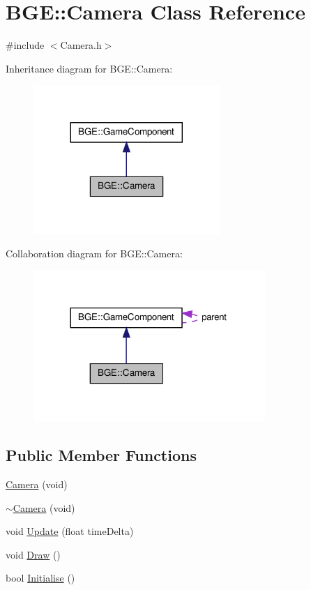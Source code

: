\hypertarget{class_b_g_e_1_1_camera}{\section{B\-G\-E\-:\-:Camera Class Reference}
\label{class_b_g_e_1_1_camera}
}


{\ttfamily \#include $<$Camera.\-h$>$}



Inheritance diagram for B\-G\-E\-:\-:Camera\-:
\nopagebreak
\begin{figure}[H]
\begin{center}
\leavevmode
\includegraphics[width=200pt]{class_b_g_e_1_1_camera__inherit__graph}
\end{center}
\end{figure}


Collaboration diagram for B\-G\-E\-:\-:Camera\-:
\nopagebreak
\begin{figure}[H]
\begin{center}
\leavevmode
\includegraphics[width=249pt]{class_b_g_e_1_1_camera__coll__graph}
\end{center}
\end{figure}
\subsection*{Public Member Functions}
\begin{DoxyCompactItemize}
\item 
\hyperlink{class_b_g_e_1_1_camera_a5c68f1ee8348320a6c47419ae2d724fb}{Camera} (void)
\item 
\hyperlink{class_b_g_e_1_1_camera_a06211f202c145b3ec8253f96e1e654a6}{$\sim$\-Camera} (void)
\item 
void \hyperlink{class_b_g_e_1_1_camera_adbf7de12984684cc6277b4fb616d1849}{Update} (float time\-Delta)
\item 
void \hyperlink{class_b_g_e_1_1_camera_a0d80a44404b91bc03be2c117d1f8185b}{Draw} ()
\item 
bool \hyperlink{class_b_g_e_1_1_camera_a93e53d2936d44b22dfb64572975e0993}{Initialise} ()
\end{DoxyCompactItemize}
